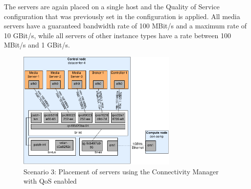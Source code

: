 The servers are again placed on a single host and the Quality of Service configuration that was previously set in the configuration is applied. All media servers have a guaranteed bandwidth rate of 100 MBit/s and a maximum rate of 10 GBit/s, while all servers of other instance types have a rate between 100 MBit/s and 1 GBit/s.

\begin{figure}[H]
\centering

\includegraphics[width=0.7\textwidth]{images/evaluation/testbed_scenario3}

\caption{Scenario 3: Placement of servers using the Connectivity Manager with QoS enabled}
\end{figure}

